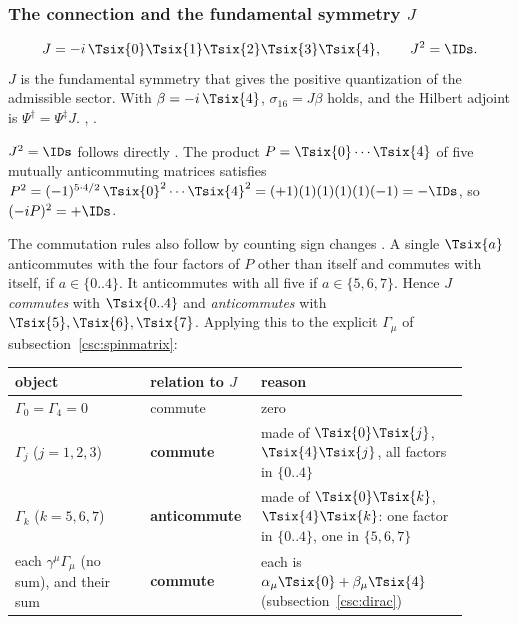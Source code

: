 \subsubsection{The connection and the fundamental symmetry \texorpdfstring{$J$}{J}}
\label{sec:6.12.6}

\begin{equation}
  J=-i\,\Tsix{0}\Tsix{1}\Tsix{2}\Tsix{3}\Tsix{4},\qquad J^2=\IDs .
\end{equation}
$J$ is the fundamental symmetry that gives the positive quantization of the admissible sector.
With $\beta=-i\,\Tsix{4}$, $\sigma_{16}=J\beta$ holds, and the Hilbert adjoint is
$\Psi^\dagger=\Psi^\ddagger J$.  , .

$J^2=\IDs$ follows directly \cfderived. The product $P=\Tsix{0}\cdots\Tsix{4}$ of five mutually
anticommuting matrices satisfies
$P^2=(-1)^{5\cdot4/2}\,\Tsix{0}^2\cdots\Tsix{4}^2=(+1)(1)(1)(1)(1)(-1)=-\IDs$, so
$(-iP)^2=+\IDs$.

The commutation rules also follow by counting sign changes \cfderived. A single $\Tsix{a}$
anticommutes with the four factors of $P$ other than itself and commutes with itself, if
$a\in\{0..4\}$. It anticommutes with all five if $a\in\{5,6,7\}$. Hence $J$ \emph{commutes} with
$\Tsix{0..4}$ and \emph{anticommutes} with $\Tsix{5},\Tsix{6},\Tsix{7}$. Applying this to the
explicit $\Gamma_\mu$ of subsection~\ref{csc:spinmatrix}:

\begin{center}
{\small
\begin{tabular}{@{}p{0.28\linewidth}p{0.19\linewidth}p{0.43\linewidth}@{}}
\toprule
\raggedright object & \raggedright relation to $J$ & \raggedright reason \tabularnewline
\midrule
\raggedright $\Gamma_0=\Gamma_4=0$ & \raggedright commute & \raggedright zero \tabularnewline
\raggedright $\Gamma_j$ ($j=1,2,3$) & \raggedright \textbf{commute} & \raggedright made of $\Tsix{0}\Tsix{j}$, $\Tsix{4}\Tsix{j}$, all factors in $\{0..4\}$ \tabularnewline
\raggedright $\Gamma_k$ ($k=5,6,7$) & \raggedright \textbf{anticommute} & \raggedright made of $\Tsix{0}\Tsix{k}$, $\Tsix{4}\Tsix{k}$: one factor in $\{0..4\}$, one in $\{5,6,7\}$ \tabularnewline
\raggedright each $\gamma^\mu\Gamma_\mu$ (no sum), and their sum & \raggedright \textbf{commute} & \raggedright each is $\alpha_\mu\Tsix{0}+\beta_\mu\Tsix{4}$ (subsection~\ref{csc:dirac}) \tabularnewline
\bottomrule
\end{tabular}
}
\end{center}


